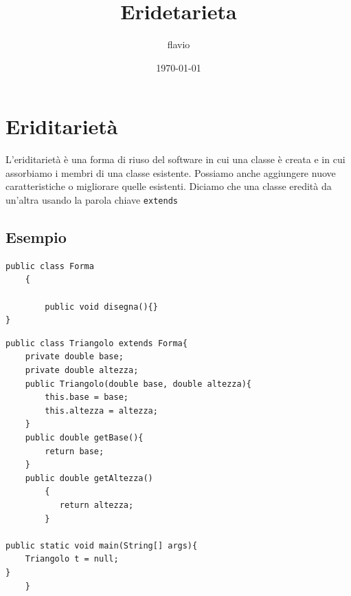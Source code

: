 \documentclass[11pt]{article}
\author{flavio}
\date{\today}
\title{Eridetarieta}
\begin{document}
\maketitle
\tableofcontents

\section{Eriditarietà}
\label{sec:org405a5de}
L'eriditarietà è una forma di riuso del software in cui una classe è creata e in cui assorbiamo i membri di una classe esistente. Possiamo anche aggiungere nuove caratteristiche o migliorare quelle esistenti. Diciamo che una classe eredità da un'altra usando la parola chiave \texttt{extends}
\subsection{Esempio}
\label{sec:org002d543}
\begin{verbatim}
public class Forma
    {

        public void disegna(){}
}
\end{verbatim}

\begin{verbatim}
public class Triangolo extends Forma{
    private double base;
    private double altezza;
    public Triangolo(double base, double altezza){
        this.base = base;
        this.altezza = altezza;
    }
    public double getBase(){
        return base;
    }
    public double getAltezza()
        {
           return altezza;
        }

public static void main(String[] args){
    Triangolo t = null;
}
    }
\end{verbatim}
\end{document}
